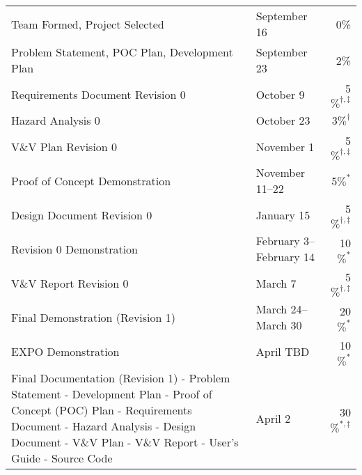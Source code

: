 \documentclass{article}
\begin{document}
\noindent \begin{tabular}{ p{9.7cm} l r}

  Team Formed, Project Selected & September 16 & 0\% \\

  Problem Statement, POC Plan, Development Plan & September 23 &
  2\% \\

  Requirements Document Revision 0 & October 9 & 5$\%^{\dagger, \ddagger}$ \\

  Hazard Analysis 0 & October 23 & 3$\%^\dagger$ \\

  V\&V Plan Revision 0 & November 1 & 5$\%^{\dagger, \ddagger}$ \\

  Proof of Concept Demonstration & November 11--22 & 5$\%^*$ \\

  Design Document Revision 0 & January 15 & 5$\%^{\dagger, \ddagger}$ \\

  Revision 0 Demonstration & February 3--February 14 & 10$\%^*$\\

  V\&V Report Revision 0 & March 7 & 5$\%^{\dagger, \ddagger}$ \\

  Final Demonstration (Revision 1) & March 24--March 30 & 20$\%^*$ \\

  EXPO Demonstration & April TBD & 10$\%^*$ \\

  Final Documentation (Revision 1)\newline 
   - Problem Statement\newline
   - Development Plan\newline
   - Proof of Concept (POC) Plan\newline
   - Requirements Document\newline
   - Hazard Analysis\newline
   - Design Document\newline
   - V\&V Plan\newline
   - V\&V Report\newline
   - User's Guide\newline
   - Source Code\newline &  April 2 & 30$\%^{*, \ddagger}$\\
 
\end{tabular}
\end{document}
